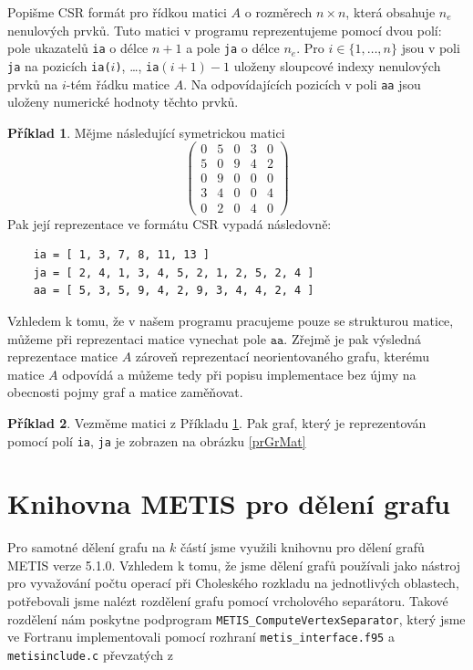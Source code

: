 \documentclass[11pt,american,czech,oneside]{book}
\theoremstyle{plain}
\theoremstyle{definition}
\newtheorem{example}{Příklad}
\begin{document}
Popišme CSR formát pro řídkou matici $A$ o rozměrech $n \times n$, která obsahuje $n_e$ nenulových prvků. Tuto matici v programu reprezentujeme pomocí dvou polí: pole ukazatelů \texttt{ia} o délce $n+1$ a pole \texttt{ja} o délce $n_e$. Pro $i\in\{1,\ldots,n\}$ jsou v poli \texttt{ja} na pozicích \texttt{ia($i$)}, \ldots, \texttt{ia$(i+1)-1$} uloženy sloupcové indexy nenulových prvků na $i$-tém řádku matice $A$. Na odpovídajících pozicích v poli \texttt{aa} jsou uloženy numerické hodnoty těchto prvků.

\begin{example}
  \label{CSRexample}
  Mějme následující symetrickou matici
  \[
    \begin{pmatrix}
      0 & 5 & 0 & 3 & 0 \\
      5 & 0 & 9 & 4 & 2 \\
      0 & 9 & 0 & 0 & 0 \\
      3 & 4 & 0 & 0 & 4 \\
      0 & 2 & 0 & 4 & 0
    \end{pmatrix}
  \]
  Pak její reprezentace ve formátu CSR vypadá následovně:
  \begin{verbatim}
    ia = [ 1, 3, 7, 8, 11, 13 ]
    ja = [ 2, 4, 1, 3, 4, 5, 2, 1, 2, 5, 2, 4 ]
    aa = [ 5, 3, 5, 9, 4, 2, 9, 3, 4, 4, 2, 4 ]
  \end{verbatim}
\end{example}

Vzhledem k tomu, že v našem programu pracujeme pouze se strukturou matice, můžeme při reprezentaci matice vynechat pole $\texttt{aa}$. Zřejmě je pak výsledná reprezentace matice $A$ zároveň reprezentací neorientovaného grafu, kterému matice $A$ odpovídá a můžeme tedy při popisu implementace bez újmy na obecnosti pojmy graf a matice zaměňovat.

\begin{example}
  Vezměme matici z Příkladu \ref{CSRexample}. Pak graf, který je reprezentován pomocí polí \texttt{ia}, \texttt{ja} je zobrazen na obrázku \ref{prGrMat}
\end{example}

\section{Knihovna METIS pro dělení grafu}

Pro samotné dělení grafu na $k$ částí jsme využili knihovnu pro dělení grafů METIS \cite{kary:13} verze 5.1.0. Vzhledem k tomu, že jsme dělení grafů používali jako nástroj pro vyvažování počtu operací při Choleského rozkladu na jednotlivých oblastech, potřebovali jsme nalézt rozdělení grafu pomocí vrcholového separátoru. Takové rozdělení nám poskytne podprogram \texttt{METIS\_ComputeVertexSeparator}, který jsme ve Fortranu implementovali pomocí rozhraní \texttt{metis\_interface.f95} a \texttt{metisinclude.c} převzatých z \cite{klforum1}
\end{document}
